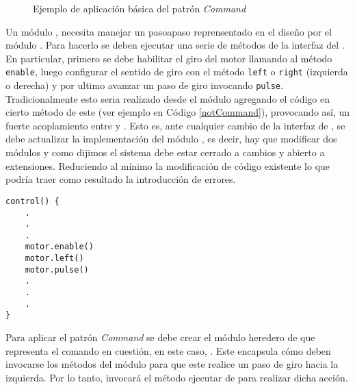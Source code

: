 \begin{figure}[H]
\caption{Ejemplo de aplicación básica del patrón \textit{Command}}
\begin{center}
\end{center}
\end{figure}
Un módulo \Controller, necesita manejar un \gls{pasoapaso} reprensentado en el diseño por el módulo \Motor. Para hacerlo se deben ejecutar una serie de métodos de la interfaz del \Motor. En particular, primero se debe habilitar el giro del motor llamando al método \verb|enable|, luego configurar el sentido de giro con el método \verb|left| o \verb|right| (izquierda o derecha) y por ultimo avanzar un paso de giro invocando \verb|pulse|. Tradicionalmente esto seria realizado desde el módulo \Controller agregando el código en cierto método de este (ver ejemplo en Código \ref{notCommand}), provocando así, un fuerte acoplamiento entre \Controller y \Motor. Esto es, ante cualquier cambio de la interfaz de \Motor, se debe actualizar la implementación del módulo \Controller, es decir, hay que modificar dos módulos y como dijimos el sistema debe estar cerrado a cambios y abierto a extensiones. Reduciendo al mínimo la modificación de código existente lo que podría traer como resultado la introducción de errores.


\begin{lstlisting}[label={notCommand}, caption=Ejemplo de implementación sin usar el patrón \textit{Command}.]
control() {
    .
    .
    .
    motor.enable()
    motor.left()
    motor.pulse()
    .
    .
    .  
}
\end{lstlisting}
Para aplicar el patrón \textit{Command} se debe crear el módulo heredero de \Orden que representa el comando en cuestión, en este caso, \MotorGirarIzq. Este encapsula cómo deben invocarse los métodos del módulo \Motor para que este realice un paso de giro hacia la izquierda. Por lo tanto, \Controller invocará el método ejecutar de \MotorGirarIzq para realizar dicha acción.

